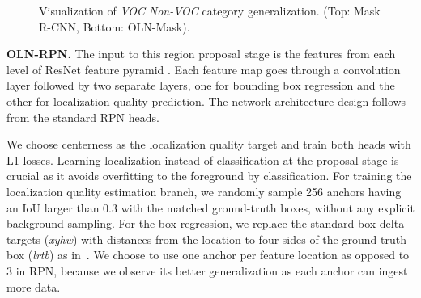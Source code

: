 \documentclass[10pt,twocolumn,letterpaper]{article}
\renewcommand{\paragraph}[1]{\vspace{1mm}\noindent\textbf{#1}}
\begin{document}
\begin{figure*}[]
\begin{center}
\vspace{-3mm}
\end{center}
\caption{\small{Visualization of \textit{VOC}  \textit{Non-VOC} category generalization. (Top: Mask R-CNN, Bottom: OLN-Mask).}}
\label{fig:coco}
\end{figure*}


\paragraph{OLN-RPN.} \quad
The input to this region proposal stage is the features from each level of ResNet feature pyramid \cite{lin2017feature}. Each feature map goes through a convolution layer followed by two separate layers, one for bounding box regression and the other for localization quality prediction. The network architecture design follows from the standard RPN heads.


We choose centerness \cite{tian2019fcos} as the localization quality target and train both heads with L1 losses. Learning localization instead of classification at the proposal stage is crucial as it avoids overfitting to the foreground by classification. For training the localization quality estimation branch, we randomly sample 256 anchors having an IoU larger than 0.3 with the matched ground-truth boxes, without any explicit background sampling. For the box regression, we replace the standard box-delta targets (\textit{xyhw}) with distances from the location to four sides of the ground-truth box (\textit{lrtb}) as in~\cite{tian2019fcos}. We choose to use one anchor per feature location as opposed to 3 in RPN, because we observe its better generalization as each anchor can ingest more data.
\end{document}
